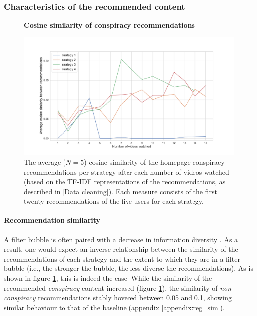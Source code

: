 \documentclass[../main.tex]{subfiles}
\begin{document}
\subsubsection{Characteristics of the recommended content}
\begin{figure}[t]
  \textbf{Cosine similarity of conspiracy recommendations}\par\medskip
  \centering
  \includegraphics[keepaspectratio, width=\textwidth]{images/Con sim.pdf}
  \caption{The average ($N = 5$) cosine similarity of the homepage conspiracy recommendations per strategy after each number of videos watched (based on the TF-IDF representations of the recommendations, as described in \ref{Data cleaning}). Each measure consists of the first twenty recommendations of the five users for each strategy.}
  \label{fig:con_similarities}
\end{figure}


\paragraph{Recommendation similarity}
A filter bubble is often paired with a decrease in information diversity \citep{nguyen2014exploring}. As a 
result, one would expect an inverse relationship between the similarity of the recommendations of each strategy 
and the extent to which they are in a filter bubble (i.e., the stronger the bubble, the less diverse the 
recommendations). As is shown in figure \ref{fig:con_similarities}, this is indeed the case. While the 
similarity of the recommended \textit{conspiracy} content increased (figure \ref{fig:con_similarities}), the 
similarity of \textit{non-conspiracy} recommendations stably hovered between 0.05 and 0.1, showing similar 
behaviour to that of the baseline (appendix \ref{appendix:reg_sim}).
\end{document}
